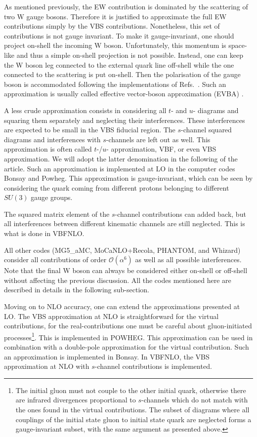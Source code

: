 As mentioned previously, the EW contribution is dominated by the scattering of two W gauge bosons.
Therefore it is justified to approximate the full EW contributions simply by the VBS contributions.
Nonetheless, this set of contributions is not gauge invariant.
To make it gauge-invariant, one should project on-shell the incoming W boson.
Unfortunately, this momentum is space-like and thus a simple on-shell projection is not possible.
Instead, one can keep the W boson leg connected to the external quark line off-shell while the one connected to the scattering is put on-shell.
Then the polarisation of the gauge boson is accommodated following the implementations of Refs.~\cite{Kuss:1995yv,Accomando:2006hq}.
Such an approximation is usually called effective vector-boson approximation (EVBA) \cite{Dawson:1984gx,Duncan:1985vj,Cahn:1983ip}.

A less crude approximation consists in considering all $t$- and $u$- diagrams and squaring them separately and neglecting their interferences.
These interferences are expected to be small in the VBS fiducial region.
The $s$-channel squared diagrams and interferences with $s$-channels are left out as well.
This approximation is often called $t$-/$u$- approximation, VBF, or even VBS approximation.
We will adopt the latter denomination in the following of the article.
Such an approximation is implemented at LO in the computer codes {\sc Bonsay} and {\sc Powheg}.
This approximation is gauge-invariant, which can be seen by considering the quark coming from different protons belonging to different $SU \left(3\right)$ gauge groups.

The squared matrix element of the $s$-channel contributions can added back, but all interferences between different kinematic channels are still neglected.
This is what is done in {\sc VBFNLO}.

All other codes ({\sc MG5\_aMC}, {\sc MoCaNLO+Recola}, {\sc PHANTOM}, and {\sc Whizard}) consider all contributions of order $\mathcal{O}{\left(\alpha^{6}\right)}$ as well as all possible interferences.
Note that the final W boson can always be considered either on-shell or off-shell without affecting the previous discussion.
All the codes mentioned here are described in details in the following sub-section.

Moving on to NLO accuracy, one can extend the approximations presented at LO.
The VBS approximation at NLO is straightforward for the virtual contributions, for the real-contributions one must be careful about gluon-initiated processes\footnote{The initial gluon must not couple to the other initial quark, otherwise there are infrared divergences proportional to $s$-channels which do not match with the ones found in the virtual contributions.
The subset of diagrams where all couplings of the initial state gluon to initial state quark are neglected forms a gauge-invariant subset, with the same argument as presented above.
}.
This is implemented in {\sc POWHEG}.
This approximation can be used in combination with a double-pole approximation \cite{Dittmaier:2015bfe} for the virtual contribution.
Such an approximation is implemented in {\sc Bonsay}.
In {\sc VBFNLO}, the VBS approximation at NLO with $s$-channel contributions is implemented.

